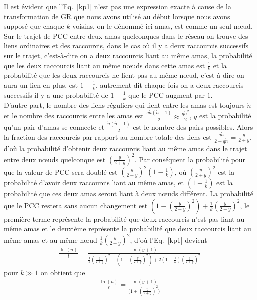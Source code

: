Il est évident que l'Eq.~\eqref{kp1} n'est pas une expression exacte à cause de la transformation de GR que nous avons utilisé au début lorsque nous avons supposé que chaque $k$ voisins, on le dénommé ici \textsf{amas}, est comme  un seul nœud.\\
Sur le trajet de PCC entre deux amas quelconques dans le réseau on trouve des liens ordinaires et des raccourcis, dans le cas où il y a deux raccourcis successifs sur le trajet, c'est-à-dire on a deux raccourcis liant au m\^{e}me \textsf{amas}, la probabilité que les deux raccourcis liant au m\^{e}me nœuds dans cette amas est $\frac{1}{k}$ et la probabilité que les deux raccourcis ne lient pas au m\^{e}me nœud, c'est-à-dire on aura un lien en plus, est  $1-\frac{1}{k}$, autrement dit chaque fois on a deux raccourcis successifs il y a une probabilité de $1-\frac{1}{k}$ que le PCC augment par $1$.\\
D'autre part, le nombre des liens réguliers qui lient entre les \textsf{amas} est toujours
$\acute{n}$ et le nombre des raccourcis entre les \textsf{amas} est $\frac{q\acute{n}(\acute{n}-1)}{2}\approx\frac{q\acute{n}^2}{2}$, 
$q$ est la probabilité qu'un pair d'amas se connecte et $\frac{\acute{n}(\acute{n}-1)}{2}$ est le nombre des pairs possibles. Alors la fraction des raccourcis par rapport au nombre totale des liens est $\frac{q\acute{n}}{2+q\acute{n}}=\frac{y}{2+y}$, d'où la probabilité d'obtenir deux raccourcis liant au m\^{e}me \textsf{amas} dans le trajet entre deux nœuds quelconque est $(\frac{y}{2+y})^2$. Par conséquent la probabilité pour que la valeur de PCC sera doublé est $(\frac{y}{2+y})^2(1-\frac{1}{k})$, où $(\frac{y}{2+y})^2$ est la probabilité d'avoir deux 
raccourcis liant au m\^{e}me \textsf{amas}, et $(1-\frac{1}{k})$ est la probabilité que ces deux amas seront liant à deux nœuds différent. La probabilité que le PCC restera sans aucun changement est $(1-(\frac{y}{2+y})^2)+\frac{1}{k}(\frac{y}{2+y})^2$, le première terme représente la probabilité que deux raccourcis n'est pas liant au m\^{e}me \textsf{amas} et le deuxième représente la probabilité 
que deux raccourcis liant au m\^{e}me \textsf{amas} et au m\^{e}me nœud $\frac{1}{k}(\frac{y}{2+y})^2$, d'où l'Eq.~\eqref{kp1} devient
\begin{eqnarray}
\frac{\ln(n)}{l}=\frac{\ln(y+1)}{\frac{1}{k}(\frac{y}{2+y})^2+(1-(\frac{y}{2+y})^2)+2(1-\frac{1}{k})(\frac{y}{2+y})^2}
\end{eqnarray}
pour $k\gg1$ on obtient que
\begin{eqnarray}
\frac{\ln(n)}{\ell}=\frac{\ln(y+1)}{\big(1+(\frac{y}{2+y})^2\big)}
\label{kp2}
\end{eqnarray}

